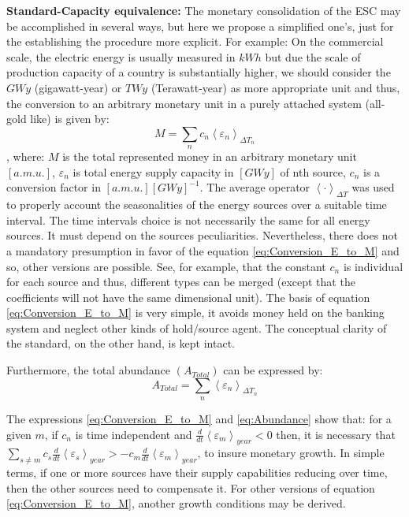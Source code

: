 \documentclass[11pt]{article}
\begin{document}
\noindent\textbf{Standard-Capacity equivalence:} The monetary consolidation of the ESC may be accomplished in several ways, but here we 
propose a simplified one's, just for the establishing the procedure more explicit. For example: On the commercial scale, the electric 
energy is usually measured in $kWh$ but due the scale of production capacity of a country is substantially higher, we should consider the 
$GWy$ (gigawatt-year) or $TWy$ (Terawatt-year) as more appropriate unit and thus, the conversion to an arbitrary monetary unit in a purely 
attached system (all-gold like) is given by:
\begin{equation}
M = \sum\limits_n {{c_n}{{\left\langle {{\varepsilon _n}} \right\rangle }_{\Delta T_{n}}}}
\label{eq:Conversion_E_to_M}
\end{equation}
, where: $M$ is the total represented money in an arbitrary monetary unit $\left[ {a.m.u.} \right]$, ${{\varepsilon _n}}$ is total energy 
supply capacity in $\left[ {GWy} \right]$ of nth source, $c_n$ is a conversion factor in $\left[ {a.m.u.} \right]{\left[ {GWy} \right]^{ 
- 1}}$. The average operator ${\left\langle \cdot \right\rangle _{\Delta T}}$ was used to properly account the seasonalities of the energy 
sources over a suitable time interval. The time intervals choice is not necessarily the same for all energy sources. It must depend on the 
sources peculiarities. Nevertheless, there does not a mandatory presumption in favor of the equation \ref{eq:Conversion_E_to_M} and so, 
other versions are possible. See, for example, that the constant $c_n$ is individual for each source and thus, different types can be merged 
(except that the coefficients will not have the same dimensional unit). The basis of equation \ref{eq:Conversion_E_to_M} is very simple, it 
avoids money held on the banking system and neglect other kinds of hold/source agent. The conceptual clarity of the standard, on the other 
hand, is kept intact.

Furthermore, the total abundance $(A_{Total})$ can be expressed by:
\begin{equation}
A_{Total} = \sum\limits_n {{{\left\langle {{\varepsilon _n}} \right\rangle }_{\Delta T_{n}}}}
\label{eq:Abundance}
\end{equation}

The expressions \ref{eq:Conversion_E_to_M} and \ref{eq:Abundance} show that: for a given $m$, if $c_n$ is time independent and
$\frac{d}{{dt}}{\left\langle {{\varepsilon _m}} \right\rangle _{year}} < 0$ then, it is necessary that $\sum\limits_{s \ne m} 
{c_{s}\frac{d}{{dt}}{{\left\langle {{\varepsilon _s}} \right\rangle }_{year}}}  >  - c_{m}\frac{d}{{dt}}{\left\langle {{\varepsilon _m}} 
\right\rangle _{year}}$, to insure monetary growth. In simple terms, if one or more sources have their supply capabilities reducing over 
time, then the other sources need to compensate it. For other versions of equation \ref{eq:Conversion_E_to_M}, another growth conditions 
may be derived.
\end{document}
